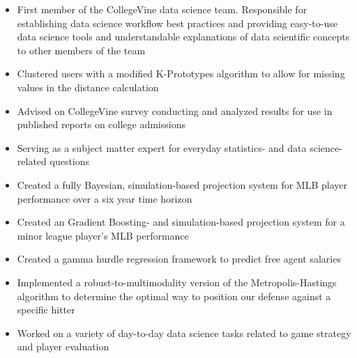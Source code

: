 \documentclass[10pt,a4paper,ragged2e,withhyper]{/Users/matt/Google Drive/GitHub/mrkaye97.github.io/resume/altacv}
\begin{document}
	\begin{paracol}{2}
	
		\begin{itemize}
		\item First member of the CollegeVine data science team. Responsible for establishing data science workflow best practices and providing easy-to-use data science tools and understandable explanations of data scientific concepts to other members of the team
		\item Clustered users with a modified K-Prototypes algorithm to allow for missing values in the distance calculation
		\item Advised on CollegeVine survey conducting and analyzed results for use in published reports on college admissions
		\item Serving as a subject matter expert for everyday statistics- and data science-related questions
		\end{itemize}
		
		\divider
		
		\begin{itemize}
		\item Created a fully Bayesian, simulation-based projection system for MLB player performance over a six year time horizon
		\item Created an Gradient Boosting- and simulation-based projection system for a minor league player's MLB performance
		\item Created a gamma hurdle regression framework to predict free agent salaries
		\item Implemented a robust-to-multimodality version of the Metropolis-Hastings algorithm to determine the optimal way to position our defense against a specific hitter
		\item Worked on a variety of day-to-day data science tasks related to game strategy and player evaluation
		\end{itemize}
		

\end{paracol}
\end{document}
